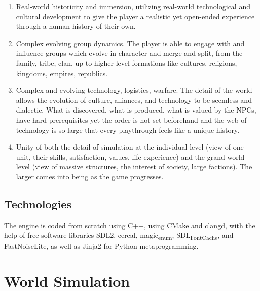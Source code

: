 \documentclass[11pt]{article}
\begin{document}
\begin{enumerate}
\item Real-world historicity and immersion, utilizing real-world technological and cultural development to give the player a realistic yet open-ended experience through a human history of their own.\\
\item Complex evolving group dynamics. The player is able to engage with and influence groups which evolve in character and merge and split, from the family, tribe, clan, up to higher level formations like cultures, religions, kingdoms, empires, republics.\\
\item Complex and evolving technology, logistics, warfare. The detail of the world allows the evolution of culture, alliances, and technology to be seemless and dialectic. What is discovered, what is produced, what is valued by the NPCs, have hard prerequisites yet the order is not set beforehand and the web of technology is so large that every playthrough feels like a unique history.\\
\item Unity of both the detail of simulation at the individual level (view of one unit, their skills, satisfaction, values, life experience) and the grand world level (view of massive structures, the interest of society, large factions). The larger comes into being as the game progresses.\\
\end{enumerate}
\subsection{Technologies}
\label{sec:org9089a11}
The engine is coded from scratch using C++, using CMake and clangd, with the help of free software libraries SDL2, cereal, magic\textsubscript{enum}, SDL\textsubscript{FontCache}, and FastNoiseLite, as well as Jinja2 for Python metaprogramming.\\
\section{World Simulation}
\label{sec:org72a3098}
\end{document}
